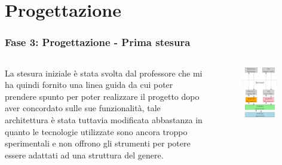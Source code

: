\documentclass{beamer}
\begin{document}
\section{Progettazione}
\begin{frame}
	\frametitle{Fase 3: Progettazione - Prima stesura}
	\begin{columns}
			La stesura iniziale è stata svolta dal professore che mi ha quindi fornito una linea guida da cui poter prendere spunto per poter realizzare il progetto dopo aver concordato sulle sue funzionalità, tale architettura è stata tuttavia modificata abbastanza in quanto le tecnologie utilizzate sono ancora troppo sperimentali e non offrono gli strumenti per potere essere adattati ad una struttura del genere.
		\begin{figure}
			\includegraphics[width=0.88\textwidth]{figures/architecture1.png}
		\end{figure}
	\end{columns}
\end{frame}
\end{document}
